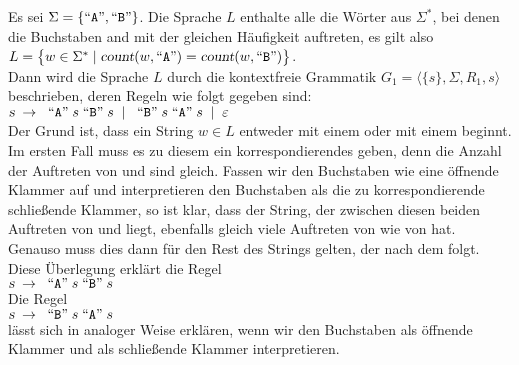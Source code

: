 \example
Es sei $\Sigma = \{ \mbox{``\texttt{A}''}, \mbox{``\texttt{B}''} \}$.  Die Sprache $L$ enthalte alle die W\"orter
aus $\Sigma^*$, bei denen die Buchstaben  and  mit der gleichen
H\"aufigkeit auftreten, es gilt also
\\[0.2cm]
\hspace*{1.3cm}
$L = \bigl\{ w \in \Sigma^* \mid \textsl{count}(w, \mbox{``\texttt{A}''}) = \textsl{count}(w, \mbox{``\texttt{B}''}) \bigr\}$.
\\[0.2cm]
Dann wird die Sprache $L$ durch die kontextfreie Grammatik $G_1 = \langle \{s\}, \Sigma, R_1, s \rangle$ beschrieben,
deren Regeln wie folgt gegeben sind:
\\[0.2cm]
\hspace*{1.3cm}
$\textsl{s} \;\rightarrow\; \;\mbox{``\texttt{A}''}\; s \;\mbox{``\texttt{B}''}\; s \;\mid\; \;\mbox{``\texttt{B}''}\; s \;\mbox{``\texttt{A}''}\; s \;\mid\; \varepsilon$
\\[0.2cm]
Der Grund ist, dass ein String $w \in L$ entweder mit einem  oder mit einem 
beginnt.  Im ersten Fall muss es zu diesem  ein korrespondierendes  geben, denn
die Anzahl der Auftreten von  und  sind gleich.  Fassen wir den Buchstaben
 wie eine \"offnende Klammer auf und interpretieren den Buchstaben  als die zu
 korrespondierende schlie{\ss}ende Klammer, so ist klar, dass der String, der zwischen diesen
beiden Auftreten von  und  liegt, ebenfalls gleich viele Auftreten von
 wie von  hat.  Genauso muss dies dann f\"ur den Rest des Strings gelten, der nach
dem  folgt.  Diese \"Uberlegung erkl\"art die Regel
\\[0.2cm]
\hspace*{1.3cm}
$\textsl{s} \;\rightarrow\; \;\mbox{``\texttt{A}''}\; s \;\mbox{``\texttt{B}''}\; s$
\\[0.2cm]
Die Regel
\\[0.2cm]
\hspace*{1.3cm}
$\textsl{s} \;\rightarrow\; \;\mbox{``\texttt{B}''}\; s \;\mbox{``\texttt{A}''}\; s$
\\[0.2cm]
l\"asst sich in analoger Weise erkl\"aren,  wenn wir den Buchstaben  als \"offnende Klammer und
 als schlie{\ss}ende Klammer interpretieren. 

